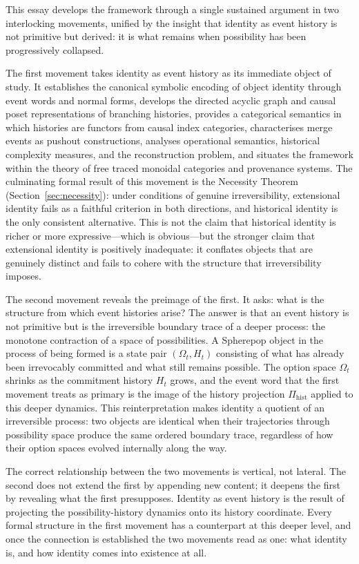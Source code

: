 \documentclass[12pt]{article}
\theoremstyle{plain}
\theoremstyle{definition}
\theoremstyle{remark}
\begin{document}
This essay develops the framework through a single sustained argument in two
interlocking movements, unified by the insight that identity as event history is
not primitive but derived: it is what remains when possibility has been
progressively collapsed.

The first movement takes identity as event history as its immediate object of
study.  It establishes the canonical symbolic encoding of object identity through
event words and normal forms, develops the directed acyclic graph and causal
poset representations of branching histories, provides a categorical semantics
in which histories are functors from causal index categories, characterises merge
events as pushout constructions, analyses operational semantics, historical
complexity measures, and the reconstruction problem, and situates the framework
within the theory of free traced monoidal categories and provenance systems.
The culminating formal result of this movement is the Necessity Theorem
(Section~\ref{sec:necessity}): under conditions of genuine irreversibility,
extensional identity fails as a faithful criterion in both directions, and
historical identity is the only consistent alternative.  This is not the claim
that historical identity is richer or more expressive---which is obvious---but
the stronger claim that extensional identity is positively inadequate: it
conflates objects that are genuinely distinct and fails to cohere with the
structure that irreversibility imposes.

The second movement reveals the preimage of the first.  It asks: what is the
structure from which event histories arise?  The answer is that an event history
is not primitive but is the irreversible boundary trace of a deeper process: the
monotone contraction of a space of possibilities.  A Spherepop object in the
process of being formed is a state pair $(\Omega_t, H_t)$ consisting of what has
already been irrevocably committed and what still remains possible.  The option
space $\Omega_t$ shrinks as the commitment history $H_t$ grows, and the event
word that the first movement treats as primary is the image of the history
projection $\Pi_{\mathrm{hist}}$ applied to this deeper dynamics.  This
reinterpretation makes identity a quotient of an irreversible process: two
objects are identical when their trajectories through possibility space produce
the same ordered boundary trace, regardless of how their option spaces evolved
internally along the way.

The correct relationship between the two movements is vertical, not lateral.
The second does not extend the first by appending new content; it deepens the
first by revealing what the first presupposes.  Identity as event history is the
result of projecting the possibility-history dynamics onto its history coordinate.
Every formal structure in the first movement has a counterpart at this deeper
level, and once the connection is established the two movements read as one: what
identity is, and how identity comes into existence at all.
\end{document}
